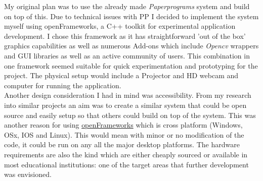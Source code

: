 \documentclass[12pt]{report}
\begin{document}
My original plan was to use the already made \emph{Paperprograms} system and build on
top of this. Due to technical issues with PP I decided to implement the system
myself using openFrameworks, a C++ toolkit for experimental application
development. I chose this framework as it has straightforward 'out of the box'
graphics capabilities as well as numerous Add-ons which include \emph{Opencv}
\cite{opencv_library} wrappers and GUI libraries as well as an active community of
users. This combination in one framework seemed suitable for quick
experimentation and prototyping for the project. The physical setup would
include a Projector and HD webcam and computer for running the application. \\

Another design consideration I had in mind was accessibility. From my research
into similar projects an aim was to create a similar system that could be open
source and easily setup so that others could build on top of the system. This
was another reason for using \href{https://openframeworks.cc/download/}{openFrameworks} which is cross platform (Windows,
OSx, IOS and Linux). This would mean with minor or no modification of the code,
it could be run on any all the major desktop platforms. The hardware
requirements are also the kind which are either cheaply sourced or available in
most educational institutions: one of the target areas that further development
was envisioned.
\end{document}
